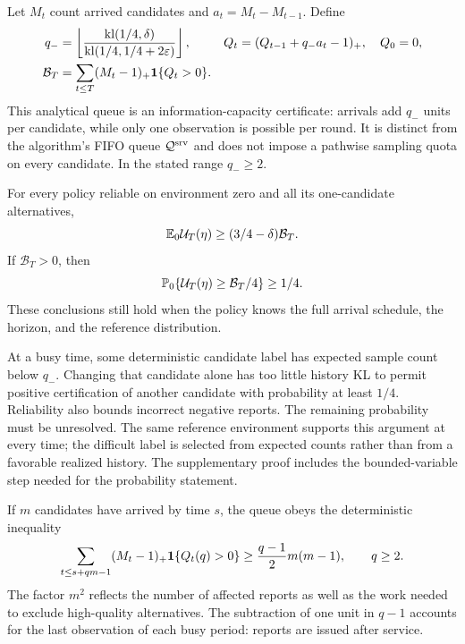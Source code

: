 \documentclass[11pt]{article}
\begin{document}
Let $M_t$ count arrived candidates and $a_t=M_t-M_{t-1}$. Define
\begin{align}
 q_-&=\left\lfloor\frac{\operatorname{kl}(1/4,\delta)}
                              {\operatorname{kl}(1/4,1/4+2\varepsilon)}\right\rfloor,
 &Q_t&=(Q_{t-1}+q_-a_t-1)_+,\quad Q_0=0,\notag\\
 \mathcal B_T&=\sum_{t\le T}(M_t-1)_+\mathbf 1\{Q_t>0\}.
 \label{eq:broadcast_queue}
\end{align}
This analytical queue is an information-capacity certificate: arrivals add
$q_-$ units per candidate, while only one observation is possible per round.
It is distinct from the algorithm's FIFO queue $\mathcal Q^{\rm srv}$ and
does not impose a pathwise sampling quota on every candidate. In the stated
range $q_-\ge2$.

\begin{theorem}
\label{thm:broadcast}
For every policy reliable on environment zero and all its one-candidate
alternatives,
\[
 \mathbb E_0\mathcal U_T(\eta)\ge(3/4-\delta)\mathcal B_T.
\]
If $\mathcal B_T>0$, then
\[
 \mathbb P_0\{\mathcal U_T(\eta)\ge\mathcal B_T/4\}\ge1/4.
\]
These conclusions still hold when the policy knows the full arrival schedule,
the horizon, and the reference distribution.
\end{theorem}

At a busy time, some deterministic candidate label has expected sample count
below $q_-$. Changing that candidate alone has too little history KL to permit
positive certification of another candidate with probability at least $1/4$.
Reliability also bounds incorrect negative reports. The remaining probability
must be unresolved. The same reference environment supports this argument at
every time; the difficult label is selected from expected counts rather than
from a favorable realized history. The supplementary proof includes the
bounded-variable step needed for the probability statement.

If $m$ candidates have arrived by time $s$, the queue obeys the deterministic
inequality
\begin{equation}
 \sum_{t\le s+qm-1}(M_t-1)_+\mathbf 1\{Q_t(q)>0\}
                  \ge\frac{q-1}{2}m(m-1),\qquad q\ge2.
 \label{eq:queue_area}
\end{equation}
The factor $m^2$ reflects the number of affected reports as well as the work
needed to exclude high-quality alternatives. The subtraction of one unit in
$q-1$ accounts for the last observation of each busy period: reports are issued
after service.
\end{document}
